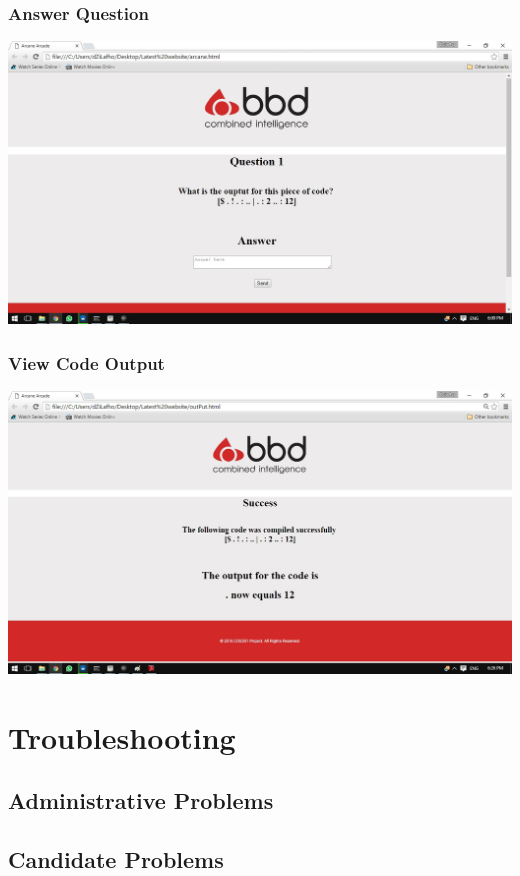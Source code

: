 \documentclass[english]{article}
\begin{document}
			\subsubsection{Answer Question}
				\includegraphics[width=\linewidth]{question.jpg}
			\subsubsection{View Code Output}
				\includegraphics[width=\linewidth]{outResults.jpg}
	
	\section{Troubleshooting}
		\subsection{Administrative Problems}
		\subsection{Candidate Problems}
		
\end{document}
